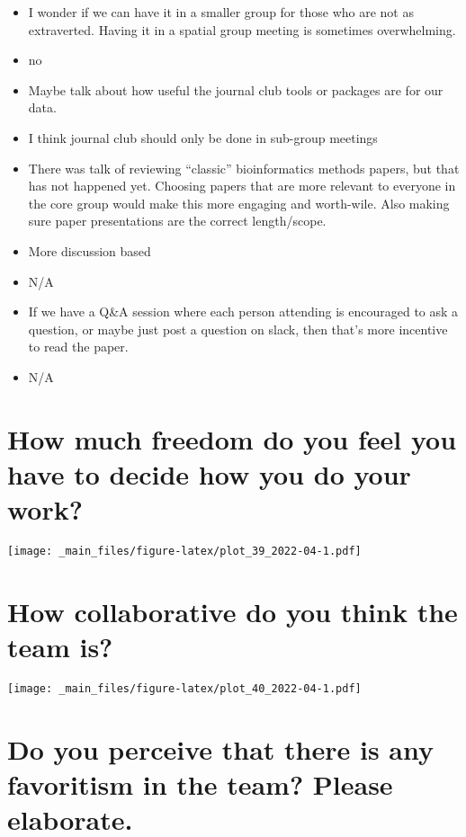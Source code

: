 \documentclass[
]{book}
\providecommand{\tightlist}{%
  \setlength{\itemsep}{0pt}\setlength{\parskip}{0pt}}
\begin{document}
\begin{itemize}
\tightlist
\item
  I wonder if we can have it in a smaller group for those who are not as extraverted. Having it in a spatial group meeting is sometimes overwhelming.
\item
  no
\item
  Maybe talk about how useful the journal club tools or packages are for our data.
\item
  I think journal club should only be done in sub-group meetings
\item
  There was talk of reviewing ``classic'' bioinformatics methods papers, but that has not happened yet. Choosing papers that are more relevant to everyone in the core group would make this more engaging and worth-wile. Also making sure paper presentations are the correct length/scope.
\item
  More discussion based
\item
  N/A
\item
  If we have a Q\&A session where each person attending is encouraged to ask a question, or maybe just post a question on slack, then that's more incentive to read the paper.
\item
  N/A
\end{itemize}

\hypertarget{how-much-freedom-do-you-feel-you-have-to-decide-how-you-do-your-work}{%
\section{How much freedom do you feel you have to decide how you do your work?}\label{how-much-freedom-do-you-feel-you-have-to-decide-how-you-do-your-work}}

\texttt{[image: \_main\_files/figure-latex/plot\_39\_2022-04-1.pdf]}

\hypertarget{how-collaborative-do-you-think-the-team-is}{%
\section{How collaborative do you think the team is?}\label{how-collaborative-do-you-think-the-team-is}}

\texttt{[image: \_main\_files/figure-latex/plot\_40\_2022-04-1.pdf]}

\hypertarget{do-you-perceive-that-there-is-any-favoritism-in-the-team-please-elaborate.}{%
\section{Do you perceive that there is any favoritism in the team? Please elaborate.}\label{do-you-perceive-that-there-is-any-favoritism-in-the-team-please-elaborate.}}
\end{document}

